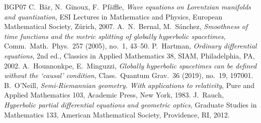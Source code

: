 \documentclass[11pt,a4paper,reqno]{amsart}
\theoremstyle{definition}
\numberwithin{equation}{section}
\begin{document}
\begin{thebibliography}{BGP07}
 C.~B\"ar, N.~Ginoux, F.~Pf\"affle, \emph{Wave equations on Lorentzian manifolds and quantization}, ESI
Lectures in Mathematics and Physics, European Mathematical Society, Z\"urich, 2007.
 A.~N.~Bernal, M.~S\'anchez, \emph{Smoothness of time functions and the metric splitting of globally
hyperbolic spacetimes}, Comm.\ Math.\ Phys.\ 257 (2005), no.~1, 43--50.
 P.~Hartman, \emph{Ordinary differential equations}, 2nd ed., Classics in Applied Mathematics 38,
SIAM, Philadelphia, PA, 2002.
 A.~Hounnonkpe, E.~Minguzzi, \emph{Globally hyperbolic spacetimes can be defined without the
`causal' condition}, Class.\ Quantum Grav.\ 36 (2019), no.~19, 197001.
 B.~O'Neill, \emph{Semi-Riemannian geometry. With applications to relativity}, Pure and Applied
Mathematics 103, Academic Press, New York, 1983.
 J.~Rauch, \emph{Hyperbolic partial differential equations and geometric optics}, Graduate Studies in
Mathematics 133, American Mathematical Society, Providence, RI, 2012.
\end{thebibliography}
\end{document}
